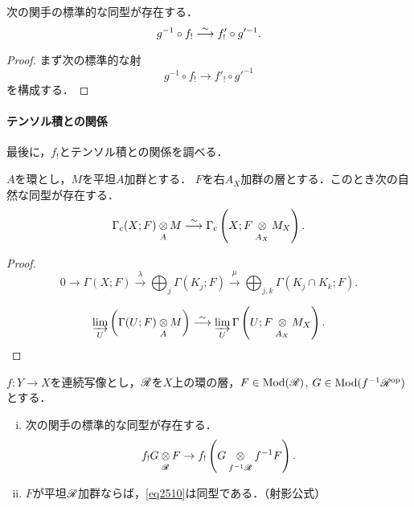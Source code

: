\begin{leftbar}
\begin{PRP}\label{PRP2511}
    次の関手の標準的な同型が存在する．
    \begin{equation}
        g^{-1}\circ f_{!}\mathrel{\overset{\sim}{\longrightarrow}} f'_{!}\circ g'^{-1}.
    \end{equation}
\end{PRP}
\end{leftbar}
\begin{proof}
    まず次の標準的な射
    \begin{equation}
        g^{-1}\circ f_{!}\to f'_{!}\circ g'^{-1}
    \end{equation}
    を構成する．
\end{proof}

\paragraph{テンソル積との関係}
最後に，\(f_!\)とテンソル積との関係を調べる．

\begin{leftbar}
\begin{LMM}\label{LMM2512}
    \(A\)を環とし，\(M\)を平坦\(A\)加群とする．
    \(F\)を右\(A_X\)加群の層とする．このとき次の自然な同型が存在する．
    \[
        \Gamma_{c}(X;F)\ttens[A]M\simar\Gamma_{c}\left(X;F\ttens[A_X]M_X\right).
    \]
\end{LMM}
\end{leftbar}
\begin{proof}
    \begin{equation}
        0\to \Gamma(X;F)\overset{\lambda}{\to}
        \bigoplus_{j}\Gamma(K_{j};F)\overset{\mu}{\to}
        \bigoplus_{j,k}\Gamma(K_{j}\cap K_{k};F).
    \end{equation}

    \begin{equation}
        \indlim[U]\left(\Gamma(U;F)\ttens[A]M\right)
        \simar\indlim[U]\Gamma\left(U;F\ttens[A_X]M_X\right).
    \end{equation}
\end{proof}

\begin{leftbar}
\begin{PRP}\label{PRP2513}
    \(f\colon Y\to X\)を連続写像とし，\(\mathscr{R}\)を\(X\)上の環の層，\(F\in\mathop{\mathrm{Mod}}\nolimits(\mathscr{R})\), \(G\in\mathop{\mathrm{Mod}}\nolimits(f^{-1}\mathscr{R}^{{\rm op}})\)とする．
    \begin{enumerate}[(i)]
        \item 次の関手の標準的な同型が存在する．
        \begin{equation}\label{eq2510}
            f_{!}G\ttens[\scR]F
            \to f_{!}\left(
                G\ttens[f^{-1}\scR]f^{-1}F
            \right).
        \end{equation}
        \item \(F\)が平坦\(\mathscr{R}\)加群ならば，\eqref{eq2510}は同型である．（射影公式）
    \end{enumerate}
\end{PRP}
\end{leftbar}

